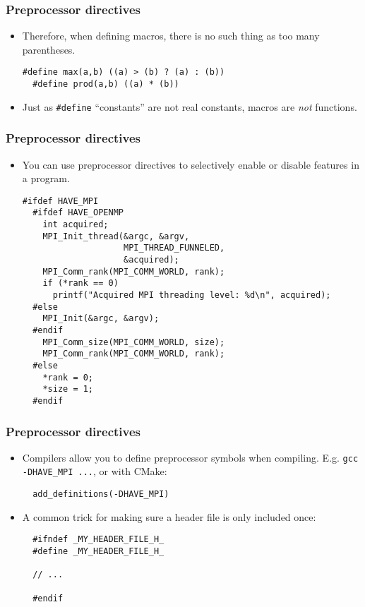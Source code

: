 \begin{frame}[fragile]
  \frametitle{Preprocessor directives}
  \begin{itemize}
  \item Therefore, when defining macros, there is no such thing as too many
    parentheses.
\begin{lstlisting}[style=c]
  #define max(a,b) ((a) > (b) ? (a) : (b))
  #define prod(a,b) ((a) * (b))
\end{lstlisting}
  \item Just as \texttt{\#define} ``constants'' are not real constants, macros
    are \emph{not} functions.
  \end{itemize}
\end{frame}

\begin{frame}[fragile]
  \frametitle{Preprocessor directives}
  \begin{itemize}
  \item You can use preprocessor directives to selectively enable or disable
    features in a program.
\begin{lstlisting}[style=c, basicstyle=\ttfamily\scriptsize]
  #ifdef HAVE_MPI
  #ifdef HAVE_OPENMP
    int acquired;
    MPI_Init_thread(&argc, &argv,
                    MPI_THREAD_FUNNELED,
                    &acquired);
    MPI_Comm_rank(MPI_COMM_WORLD, rank);
    if (*rank == 0)
      printf("Acquired MPI threading level: %d\n", acquired);
  #else
    MPI_Init(&argc, &argv);
  #endif
    MPI_Comm_size(MPI_COMM_WORLD, size);
    MPI_Comm_rank(MPI_COMM_WORLD, rank);
  #else
    *rank = 0;
    *size = 1;
  #endif
\end{lstlisting}
  \end{itemize}
\end{frame}

\begin{frame}[fragile]
  \frametitle{Preprocessor directives}
  \begin{itemize}
  \item Compilers allow you to define preprocessor symbols when compiling.
    E.g. \texttt{gcc -DHAVE\_MPI ...}, or with CMake:
\begin{lstlisting}
  add_definitions(-DHAVE_MPI)
\end{lstlisting}
  \item A common trick for making sure a header file is only included once:
\begin{lstlisting}
  #ifndef _MY_HEADER_FILE_H_
  #define _MY_HEADER_FILE_H_

  // ...

  #endif
\end{lstlisting}
  \end{itemize}
\end{frame}

